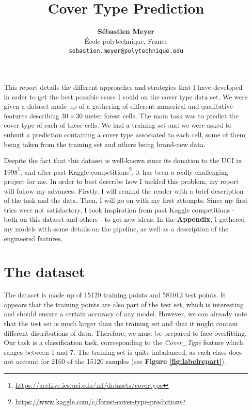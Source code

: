 \documentclass{article}
\title{Cover Type Prediction}
\author{
  \textbf{Sébastien Meyer} \\
  École polytechnique, France \\
  \texttt{sebastien.meyer@polytechnique.edu}
}
\date{}
\begin{document}
\maketitle

\begin{multicols}{2}

This report details the different approaches and strategies that I have developed in order
to get the best possible score I could on the cover type data set. We were given a
dataset made up of a
gathering of different numerical and qualitative features describing $30 \times 30$ meter
forest cells. The main task was to predict the cover type of each of these cells. We had
a training set and we were asked to submit a prediction containing a cover type associated
to each
cell, some of them being taken from the training set and others being brand-new data.

Despite the fact that this dataset is well-known since its donation to the UCI in
1998\footnote{\url{https://archive.ics.uci.edu/ml/datasets/covertype}},
and after past Kaggle
competitions\footnote{\url{https://www.kaggle.com/c/forest-cover-type-prediction}}, it has
been a really challenging project for me. In order
to best describe how I tackled this problem, my report will follow my advances. Firstly, I
will remind the reader with a brief description of the task and the data. Then, I will go on
with my first attempts. Since my first tries were not satisfactory,
I took inspiration from past Kaggle competitions - both on this dataset and others - to get
new ideas. In the 
\textbf{Appendix}, I gathered my models with some details on the
pipeline, as well as a description of the engineered features.

\section{The dataset}

The dataset is made up of 15120 training points and 581012 test points. It appears that the
training
points are also part of the test set, which is interesting and should ensure a certain
accuracy of any model. However, we can already note that the test set is much larger than
the training set and that it might contain different distributions of data. Therefore, we
must be prepared to face overfitting. Our task is a classification task, corresponding to
the \textit{Cover\_Type} feature which
ranges between 1 and 7. The training set is quite imbalanced, as each class does not account for
2160 of the 15120 samples (see \textbf{Figure \ref{fig:labelrepart}}).


\end{multicols}
\end{document}
